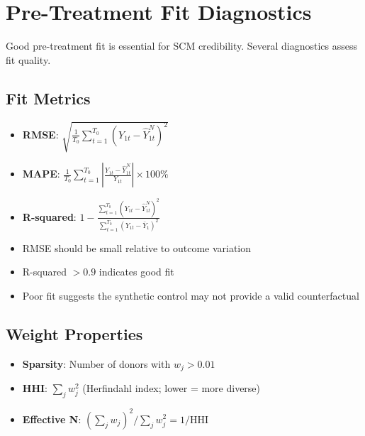 \section{Pre-Treatment Fit Diagnostics}
\label{sec:scm_diagnostics}

Good pre-treatment fit is essential for SCM credibility. Several diagnostics assess fit quality.

\subsection{Fit Metrics}

\begin{definition}
\begin{itemize}
    \item \textbf{RMSE}: $\sqrt{\frac{1}{T_0} \sum_{t=1}^{T_0} (Y_{1t} - \hat{Y}_{1t}^N)^2}$
    \item \textbf{MAPE}: $\frac{1}{T_0} \sum_{t=1}^{T_0} \left|\frac{Y_{1t} - \hat{Y}_{1t}^N}{Y_{1t}}\right| \times 100\%$
    \item \textbf{R-squared}: $1 - \frac{\sum_{t=1}^{T_0}(Y_{1t} - \hat{Y}_{1t}^N)^2}{\sum_{t=1}^{T_0}(Y_{1t} - \bar{Y}_1)^2}$
\end{itemize}
\end{definition}

\begin{remark}
\begin{itemize}
    \item RMSE should be small relative to outcome variation
    \item R-squared $> 0.9$ indicates good fit
    \item Poor fit suggests the synthetic control may not provide a valid counterfactual
\end{itemize}
\end{remark}

\subsection{Weight Properties}

\begin{definition}
\begin{itemize}
    \item \textbf{Sparsity}: Number of donors with $w_j > 0.01$
    \item \textbf{HHI}: $\sum_j w_j^2$ (Herfindahl index; lower = more diverse)
    \item \textbf{Effective N}: $(\sum_j w_j)^2 / \sum_j w_j^2 = 1/\text{HHI}$
\end{itemize}
\end{definition}

